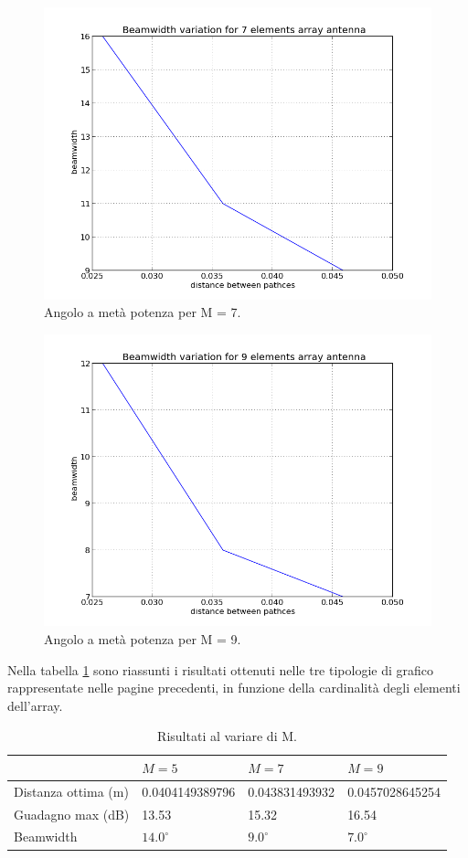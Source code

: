 \begin{figure}
\centering
\caption{Angolo a metà potenza per M = 7.}
\label{img:bw7}
\includegraphics[scale=0.5]{Immagini/bw7}
\end{figure}
\begin{figure}
\centering
\caption{Angolo a metà potenza per M = 9.}
\label{img:bw9}
\includegraphics[scale=0.5]{Immagini/bw9}
\end{figure}

Nella tabella \ref{tab:dgbopt} sono riassunti i risultati ottenuti nelle tre tipologie di grafico rappresentate nelle pagine precedenti, in funzione della cardinalità degli elementi dell'array.
\begin{table}[h]\footnotesize
\caption{Risultati al variare di M.}
\label{tab:dgbopt}
\begin{tabularx}{\textwidth}{XXXX}
\toprule
& $M = 5$ & $M = 7$ & $M = 9$ \\
\midrule
Distanza ottima (m) & 0.0404149389796 & 0.043831493932 & 0.0457028645254 \\
Guadagno max	 (dB) & 13.53 & 15.32 & 16.54 \\
Beamwidth & $14.0^\circ$ & $9.0^\circ$ & $7.0^\circ$ \\
\bottomrule
\end{tabularx}
\end{table}
